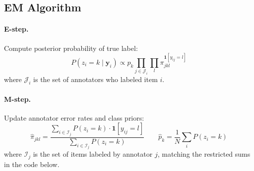 \subsection{EM Algorithm}

\paragraph{E-step.} Compute posterior probability of true label:
\[
P(z_i = k \mid \mathbf{y}_i) \propto p_k \prod_{j \in \mathcal{J}_i} \prod_l \pi_{jkl}^{\mathbf{1}[y_{ij}=l]}
\]
where $\mathcal{J}_i$ is the set of annotators who labeled item $i$.

\paragraph{M-step.} Update annotator error rates and class priors:
\[
\hat{\pi}_{jkl} = \frac{\sum_{i \in \mathcal{I}_j} P(z_i=k) \cdot \mathbf{1}[y_{ij}=l]}{\sum_{i \in \mathcal{I}_j} P(z_i=k)}
\qquad
\hat{p}_k = \frac{1}{N} \sum_i P(z_i = k)
\]
where $\mathcal{I}_j$ is the set of items labeled by annotator $j$, matching the restricted sums in the code below.

